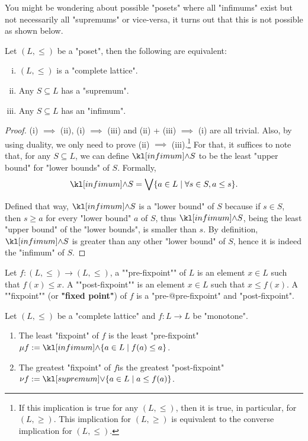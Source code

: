 \documentclass[main.tex]{subfiles}
\begin{document}
You might be wondering about possible "posets" where all "infimums" exist but not necessarily all "supremums" or vice-versa, it turns out that this is not possible as shown below.
\begin{prop}\label{prop:posetlattice}%
	Let $(L, \leq)$ be a "poset", then the following are equivalent:
	\begin{enumerate}[(i)]
		\item $(L,\leq)$ is a "complete lattice".
		\item Any $S \subseteq L$ has a "supremum".
		\item Any $S \subseteq L$ has an "infimum".
	\end{enumerate}
\end{prop}
\begin{proof}
	(i) $\implies$ (ii), (i) $\implies$ (iii) and (ii) + (iii) $\implies$ (i) are all trivial. Also, by using duality, we only need to prove (ii) $\implies$ (iii).\footnote{If this implication is true for any $(L,\leq)$, then it is true, in particular, for $(L,\geq)$. This implication for $(L,\geq)$ is equivalent to the converse implication for $(L,\leq)$.} For that, it suffices to note that, for any $S \subseteq L$, we can define $\infimum S$ to be the least "upper bound" for "lower bounds" of $S$. Formally, \[\infimum S = \bigvee \{a \in L \mid \forall s \in S, a \leq s\}.\]
	
	Defined that way, $\infimum S$ is a "lower bound" of $S$ because if $s \in S$, then $s \geq a$ for every "lower bound" $a$ of $S$, thus $\infimum S$, being the least "upper bound" of the "lower bounds", is smaller than $s$. By definition, $\infimum S$ is greater than any other "lower bound" of $S$, hence it is indeed the "infimum" of $S$.
\end{proof}
\begin{defn}[Fixpoints]
	\AP Let $f: (L, \leq) \rightarrow (L, \leq)$, a ""pre-fixpoint"" of $L$ is an element $x \in L$ such that $f(x) \leq x$. \AP A ""post-fixpoint"" is an element $x\in L$ such that $x \leq f(x)$. \AP A ""fixpoint"" (or \textbf{"fixed point"}) of $f$ is a "pre-@pre-fixpoint" and "post-fixpoint".
\end{defn}
\begin{thm}\label{thm:knatar}
	Let $(L, \leq)$ be a "complete lattice" and $f: L\rightarrow L$ be "monotone". 
	\begin{enumerate}
		\item The least "fixpoint" of $f$ is the least "pre-fixpoint" $\mu f := \infimum \{a \in L \mid f(a) \leq a\}$.
		\item The greatest "fixpoint" of $f$is the greatest "post-fixpoint" $\nu f := \supremum \{a \in L \mid a \leq f(a)\}$.
	\end{enumerate}%
\end{thm}
\end{document}
